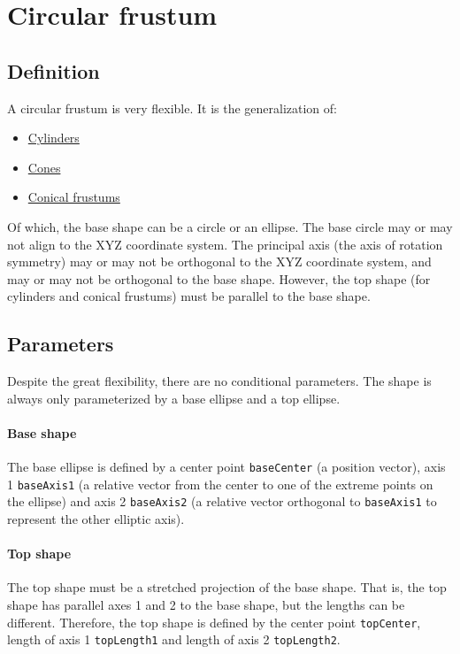 \documentclass{report}
\begin{document}
			\section{Circular frustum}
				\subsection{Definition} A circular frustum is very flexible. It is the generalization of:
					\begin{itemize}
						\item \href{http://mathworld.wolfram.com/Cylinder.html}{Cylinders}
						\item \href{http://mathworld.wolfram.com/Cone.html}{Cones}
						\item \href{http://mathworld.wolfram.com/ConicalFrustum.html}{Conical frustums}
					\end{itemize}

					Of which, the base shape can be a circle or an ellipse. The base circle may or may not align to the
					XYZ coordinate system. The principal axis (the axis of rotation symmetry) may or may not be
					orthogonal to the XYZ coordinate system, and may or may not be orthogonal to the base shape.
					However, the top shape (for cylinders and conical frustums) must be parallel to the base shape.
				\subsection{Parameters} Despite the great flexibility, there are no conditional parameters. The shape
				is always only parameterized by a base ellipse and a top ellipse.
					\paragraph{Base shape} The base ellipse is defined by a center point \texttt{baseCenter} (a
					position vector), axis 1 \texttt{baseAxis1} (a relative vector from the center to one of the
					extreme points on the ellipse) and axis 2 \texttt{baseAxis2} (a relative vector orthogonal to
					\texttt{baseAxis1} to represent the other elliptic axis).
					\paragraph{Top shape} The top shape must be a stretched projection of the base shape. That is, the
					top shape has parallel axes 1 and 2 to the base shape, but the lengths can be different. Therefore,
					the top shape is defined by the center point \texttt{topCenter}, length of axis 1
					\texttt{topLength1} and length of axis 2 \texttt{topLength2}.

	
\end{document}

